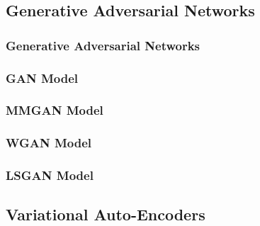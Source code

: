 \subsection{Generative Adversarial Networks}
\subsubsection{Generative Adversarial Networks}
\subsubsection{GAN Model}
\subsubsection{MMGAN Model}
\subsubsection{WGAN Model}
\subsubsection{LSGAN Model}

\subsection{Variational Auto-Encoders}
